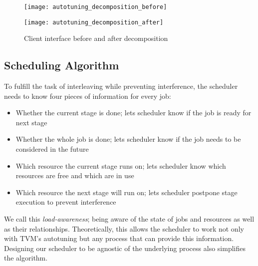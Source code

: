 \begin{figure}
	\begin{minipage}[b]{.5\textwidth}
		\centering\texttt{[image: autotuning\_decomposition\_before]}
		\label{fig:autotuning-decomposition-before}
	\end{minipage}%
	\begin{minipage}[b]{.5\textwidth}
		\centering\texttt{[image: autotuning\_decomposition\_after]}
		\label{fig:autotuning-decomposition-after}
	\end{minipage}
	\caption{Client interface before and after decomposition}
	\label{fig:autotuning-decomposition}
\end{figure}

\subsection{Scheduling Algorithm}
To fulfill the task of interleaving while preventing interference, the scheduler needs to know four pieces of information for every job:
\begin{itemize}
	\item Whether the current stage is done; lets scheduler know if the job is ready for next stage
	\item Whether the whole job is done; lets scheduler know if the job needs to be considered in the future
	\item Which resource the current stage runs on; lets scheduler know which resources are free and which are in use
	\item Which resource the next stage will run on; lets scheduler postpone stage execution to prevent interference
\end{itemize}
We call this \textit{load-awareness}; being aware of the state of jobs and resources as well as their relationships. Theoretically, this allows the scheduler to work not only with TVM's autotuning but any process that can provide this information. Designing our scheduler to be agnostic of the underlying process also simplifies the algorithm.

